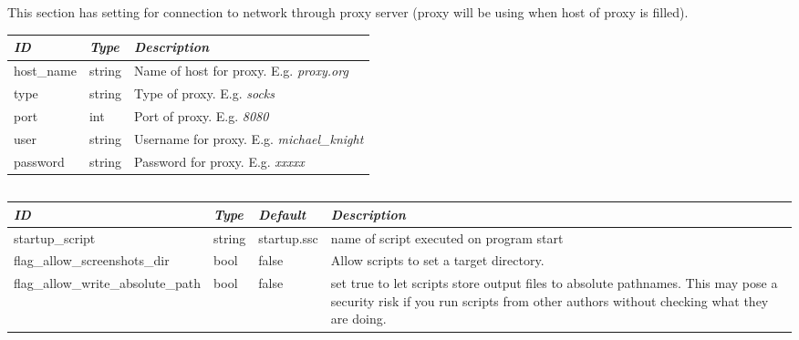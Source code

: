 \subsection{}
This section has setting for connection to network through proxy server (proxy will be using when host of proxy is filled).

\noindent%
\begin{tabularx}{\textwidth}{l|l|X}\toprule
\emph{ID}  & \emph{Type} & \emph{Description}\\\midrule
host\_name & string & Name of host for proxy. E.g. \emph{proxy.org}\\%
type	   & string & Type of proxy. E.g. \emph{socks}\\%
port       & int    & Port of proxy. E.g. \emph{8080}\\%
user       & string & Username for proxy. E.g. \emph{michael\_knight}\\%
password   & string & Password for proxy. E.g. \emph{xxxxx}\\\bottomrule
\end{tabularx}

\subsection{}

\begin{tabularx}{\textwidth}{l|l|l|X}\toprule
\emph{ID}                  & \emph{Type} & \emph{Default} & \emph{Description}\\\midrule
startup\_script                            & string & startup.ssc & name of script executed on program start\\
flag\_allow\_screenshots\_dir              & bool   & false       & Allow scripts to set a target directory.\\
flag\_allow\_write\_absolute\_path         & bool   & false       & set true to let scripts store output files to absolute pathnames.
                                                                    This may pose a security risk if you run scripts from other authors
                                                                    without checking what they are doing.\\\bottomrule 
\end{tabularx}

\subsection{}

